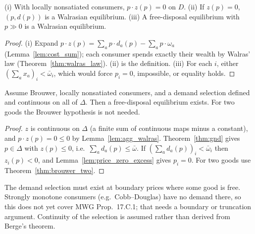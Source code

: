 \begin{lemma}
\label{lem:agg_walras}
\leanok
{}
(i) With locally nonsatiated consumers, $p \cdot z(p) = 0$ on $D$. (ii) If $z(p) = 0$, $(p, d(p))$ is a Walrasian
equilibrium. (iii) A free-disposal equilibrium with $p \gg 0$ is a Walrasian equilibrium.
\end{lemma}
\begin{proof}
\leanok
(i) Expand $p \cdot z(p) = \sum_a p \cdot d_a(p) - \sum_a p \cdot \omega_a$ (Lemma~\ref{lem:cost_sum}); each consumer
spends exactly their wealth by Walras' law (Theorem~\ref{thm:walras_law}). (ii) is the definition. (iii) For each $i$,
either $(\sum_a x_a)_i < \bar\omega_i$, which would force $p_i = 0$, impossible, or equality holds.
\end{proof}

\begin{theorem}
\label{thm:ge_existence}
\leanok
{}
Assume Brouwer, locally nonsatiated consumers, and a demand selection defined and continuous on all of $\Delta$. Then a
free-disposal equilibrium exists. For two goods the Brouwer hypothesis is not needed.
\end{theorem}
\begin{proof}
\leanok
$z$ is continuous on $\Delta$ (a finite sum of continuous maps minus a constant), and $p \cdot z(p) = 0 \le 0$ by
Lemma~\ref{lem:agg_walras}. Theorem~\ref{thm:gnd} gives $p \in \Delta$ with $z(p) \le 0$, i.e.\
$\sum_a d_a(p) \le \bar\omega$. If $(\sum_a d_a(p))_i < \bar\omega_i$ then $z_i(p) < 0$, and
Lemma~\ref{lem:price_zero_excess} gives $p_i = 0$. For two goods use Theorem~\ref{thm:brouwer_two}.
\end{proof}

\begin{remark}[Scope]
The demand selection must exist at boundary prices where some good is free. Strongly monotone consumers (e.g.\
Cobb--Douglas) have no demand there, so this does not yet cover MWG Prop.~17.C.1; that needs a boundary or truncation
argument. Continuity of the selection is assumed rather than derived from Berge's theorem.
\end{remark}

